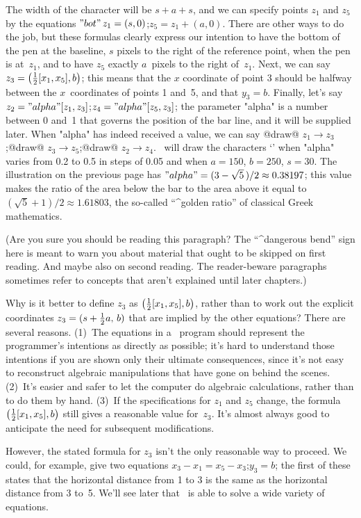 The width of the character will be $s+a+s$, and we can specify points
$z_1$ and $z_5$ by the equations
\begindisplay
$"bot"\,z_1=(s,0)$;\qquad $z_5=z_1+(a,0)$.
\enddisplay
There are other ways to do the job, but these formulas clearly express
our intention to have the bottom of the pen at the baseline, $s$ pixels
to the right of the reference point, when the pen is at~$z_1$,
and to have $z_5$ exactly $a$~pixels to the right of~$z_1$.
Next, we can say
\begindisplay
$z_3=\bigl({1\over2}[x_1,x_5],b\bigr)$;
\enddisplay
this means that the $x$ coordinate of point 3 should be halfway between
the $x$~coordinates of points 1 and~5, and that $y_3=b$.  Finally, let's say
\begindisplay
$z_2="alpha"[z_1,z_3]$;\qquad $z_4="alpha"[z_5,z_3]$;
\enddisplay
the parameter "alpha" is a number between 0 and~1 that governs the
position of the bar line, and it will be supplied later. When "alpha"
has indeed received a value, we can say
\begindisplay
@draw@ $z_1\to z_3$;\qquad @draw@ $z_3\to z_5$;\qquad @draw@ $z_2\to z_4$.
\enddisplay
\MF\ will draw the characters `{\manual\sevenAs}' when "alpha" varies
from 0.2 to 0.5 in steps of 0.05 and when $a=150$, $b=250$, $s=30$.
The illustration on the previous page has $"alpha"=(3-\sqrt5\,)/2\approx
0.38197$; this value makes the ratio of the area below the bar to the area
above it equal to $(\sqrt5+1)/2\approx1.61803$, the so-called ``^{golden
ratio}'' of classical Greek mathematics.

\danger (Are you sure you should be reading this paragraph? The
``^{dangerous bend}'' sign here is meant to warn you about material that
ought to be skipped on first reading. And maybe also on second reading.
The reader-beware paragraphs sometimes refer to concepts that aren't
explained until later chapters.)

\dangerexercise Why is it better to define $z_3$ as $\bigl({1\over2}[x_1,
x_5],b\bigr)$, rather than to work out the explicit coordinates
$z_3=(s+{1\over2}a,\,b)$ that are implied by the other equations?
\answer There are several reasons. (1)~The equations in a \MF\ program
should represent the programmer's intentions as directly as possible;
it's hard to understand those intentions if you are shown only
their ultimate consequences, since it's not easy to reconstruct algebraic
manipulations that have gone on behind the scenes. (2)~It's easier and
safer to let the computer do algebraic calculations, rather than
to do them by hand. (3)~If the specifications for $z_1$ and $z_5$ change,
the formula $\bigl({1\over2}[x_1,x_5],b\bigr)$
still gives a reasonable value for~$z_3$. It's
almost always good to anticipate the need for subsequent modifications.\par
However, the stated formula for $z_3$ isn't the only reasonable way to
proceed. We could, for example, give two equations
\begindisplay
$x_3-x_1=x_5-x_3$;\qquad $y_3=b$;
\enddisplay
the first of these states that the horizontal distance from 1 to 3 is
the same as the horizontal distance from 3 to~5. We'll see later that
\MF\ is able to solve a wide variety of equations.

